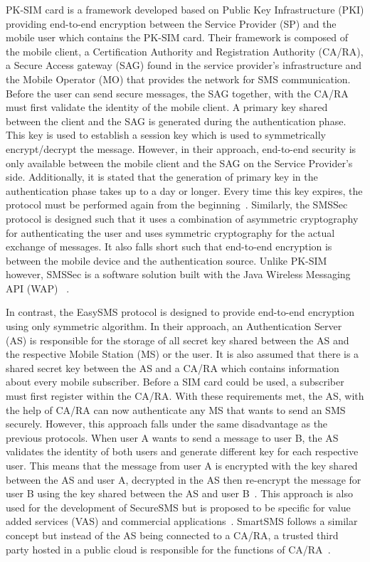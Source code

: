 \documentclass[journal]{./IEEE/IEEEtran}
\begin{document}
PK-SIM card is a framework developed based on Public Key
Infrastructure (PKI) providing end-to-end encryption between the Service
Provider (SP) and the mobile user which contains the PK-SIM card. Their
framework is composed of the mobile client, a Certification Authority and
Registration Authority (CA/RA), a Secure Access gateway (SAG) found in the service provider's infrastructure and the Mobile Operator (MO) that
provides the network for SMS communication. Before the user can send secure
messages, the SAG together, with the CA/RA must first validate the identity
of the mobile client. A primary key shared between the client and the SAG is
generated during the authentication phase. This key is used to establish
a session key which is used to symmetrically encrypt/decrypt the message.
However, in their approach, end-to-end security is only available between
the mobile client and the SAG on the Service Provider's side. Additionally,
it is stated that the generation of primary key in the authentication phase
takes up to a day or longer. Every time this key expires, the protocol must
be performed again from the beginning~\cite{PKSIMcard07}. Similarly, the SMSSec
protocol is designed such that it uses a combination of asymmetric
cryptography for authenticating the user and uses symmetric cryptography
for the actual exchange of messages. It also falls short such that
end-to-end encryption is between the mobile device and the authentication
source. Unlike PK-SIM however, SMSSec is a software solution built with
the Java Wireless Messaging API (WAP) ~\cite{SMSSec08}.

In contrast, the EasySMS protocol is designed to provide
end-to-end encryption using only symmetric algorithm. In their approach,
an Authentication Server (AS) is responsible for the storage of all secret key
shared between the AS and the respective Mobile Station (MS) or the user.
It is also assumed that there is a shared secret key between the AS and a
CA/RA which contains information about every mobile subscriber. Before a SIM
card could be used, a subscriber must first register within the CA/RA. With
these requirements met, the AS, with the help of CA/RA can now authenticate
any MS that wants to send an SMS securely. However, this approach falls under
the same disadvantage as the previous protocols. When user A wants to send a message to user B, the AS validates the identity of both users and generate
different key for each respective user. This means that the message from
user A is encrypted with the key shared between the AS and user A, decrypted
in the AS then re-encrypt the message for user B using the key shared between
the AS and user B~\cite{EasySMS14}. This approach is also used for the development of
SecureSMS but is proposed to be specific for value added
services (VAS) and commercial applications~\cite{SecureSMS14}. SmartSMS follows
a similar concept but instead of the AS being connected to a CA/RA, a
trusted third party hosted in a public cloud is responsible for the
functions of CA/RA~\cite{SmartSMS16}.
\end{document}
